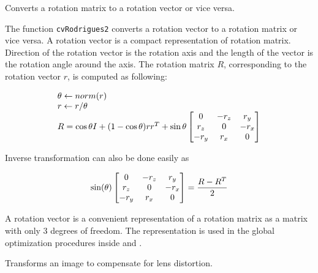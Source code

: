 \label{Rodrigues2}

Converts a rotation matrix to a rotation vector or vice versa.


\begin{description}
\end{description}

The function \texttt{cvRodrigues2} converts a rotation vector to a rotation matrix or vice versa. A rotation vector is a compact representation of rotation matrix. Direction of the rotation vector is the rotation axis and the length of the vector is the rotation angle around the axis. The rotation matrix $R$, corresponding to the rotation vector $r$, is computed as following:

\[
\begin{array}{l}
\theta \leftarrow norm(r)\\
r \leftarrow r/\theta\\
R = \cos{\theta} I + (1-\cos{\theta}) r r^T + \sin{\theta}
\begin{bmatrix} 0 & -r_z & r_y\\ r_z & 0 & -r_x\\ -r_y & r_x & 0 \end{bmatrix}
\end{array}
\]

Inverse transformation can also be done easily as

\[
\sin(\theta)
\begin{bmatrix} 0 & -r_z & r_y\\ r_z & 0 & -r_x\\ -r_y & r_x & 0 \end{bmatrix}
=
\frac{R - R^T}{2}
\]

A rotation vector is a convenient representation of a rotation matrix
as a matrix with only 3 degrees of freedom. The representation is
used in the global optimization procedures inside
and .

\label{Undistort2}

Transforms an image to compensate for lens distortion.



